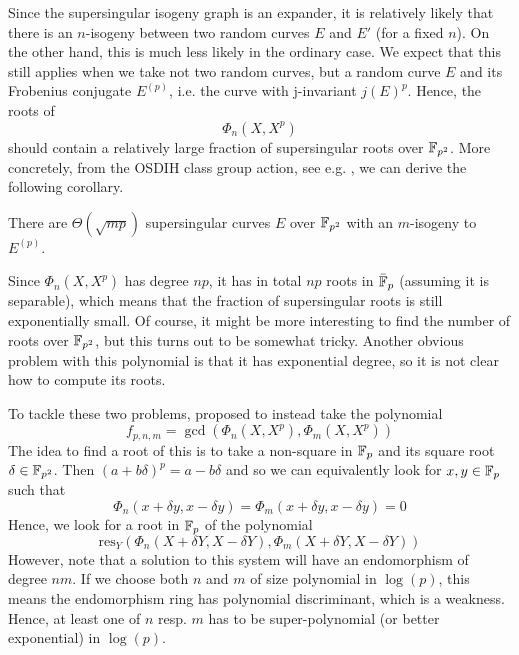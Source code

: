 Since the supersingular isogeny graph is an expander, it is relatively likely that there is an $n$-isogeny between two random curves $E$ and $E'$ (for a fixed $n$).
On the other hand, this is much less likely in the ordinary case.
We expect that this still applies when we take not two random curves, but a random curve $E$ and its Frobenius conjugate $E^{(p)}$, i.e. the curve with j-invariant $j(E)^p$.
Hence, the roots of
\begin{equation*}
    \Phi_n(X, X^p)
\end{equation*}
should contain a relatively large fraction of supersingular roots over $\mathbb{F}_{p^2}$.
More concretely, from the OSDIH class group action, see e.g. \cite[Thm~4.3]{chenu_smith}, we can derive the following corollary.
\begin{corollary}
    \label{prop:osidh_class_group_action}
    There are $\Theta(\sqrt{mp})$ supersingular curves $E$ over $\mathbb{F}_{p^2}$ with an $m$-isogeny to $E^{(p)}$.
\end{corollary}
Since $\Phi_n(X, X^p)$ has degree $np$, it has in total $np$ roots in $\bar{\mathbb{F}}_p$ (assuming it is separable), which means that the fraction of supersingular roots is still exponentially small.
Of course, it might be more interesting to find the number of roots over $\mathbb{F}_{p^2}$, but this turns out to be somewhat tricky.
Another obvious problem with this polynomial is that it has exponential degree, so it is not clear how to compute its roots.

To tackle these two problems, \cite{base_paper} proposed to instead take the polynomial
\begin{equation*}
    f_{p, n, m} = \gcd(\Phi_n(X, X^p), \Phi_m(X, X^p))
\end{equation*}
The idea to find a root of this is to take a non-square in $\mathbb{F}_p$ and its square root $\delta \in \mathbb{F}_{p^2}$.
Then $(a + b\delta)^p = a - b\delta$ and so we can equivalently look for $x, y \in \mathbb{F}_p$ such that
\begin{equation*}
    \Phi_n(x + \delta y, x - \delta y) = \Phi_m(x + \delta y, x - \delta y) = 0
\end{equation*}
Hence, we look for a root in $\mathbb{F}_p$ of the polynomial
\begin{equation*}
    \mathrm{res}_Y(\Phi_n(X + \delta Y, X - \delta Y), \Phi_m(X + \delta Y, X - \delta Y))
\end{equation*}
However, note that a solution to this system will have an endomorphism of degree $nm$.
If we choose both $n$ and $m$ of size polynomial in $\log(p)$, this means the endomorphism ring has polynomial discriminant, which is a weakness.
Hence, at least one of $n$ resp. $m$ has to be super-polynomial (or better exponential) in $\log(p)$.

